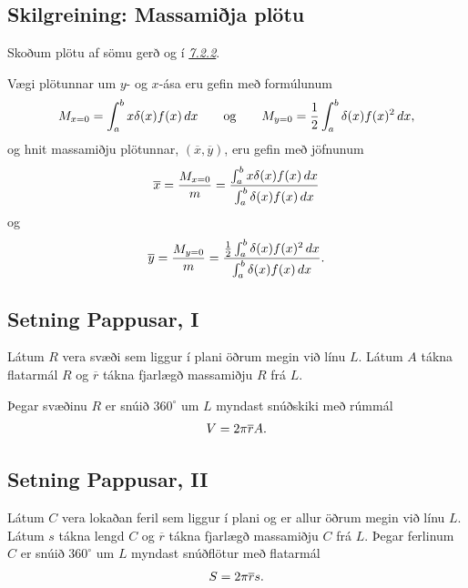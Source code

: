 \documentclass[b5paper,10pt,icelandic]{sphinxmanual}
\begin{document}
\subsection{Skilgreining: Massamiðja plötu}
\label{kafli07:skilgreining-massamija-plotu}\label{kafli07:index-14}
Skoðum plötu af sömu gerð og í {\hyperref[kafli07:massi\string-plotu]{\emph{7.2.2}}}.

Vægi plötunnar um \(y\)- og \(x\)-ása eru gefin með formúlunum
\begin{gather}
\begin{split}M_{x=0}=\int_a^b x\delta(x)f(x)\,dx
\qquad\mbox{og}\qquad
M_{y=0}=\frac{1}{2}\int_a^b \delta(x)f(x)^2\,dx,\end{split}\notag
\end{gather}
og hnit massamiðju plötunnar, \((\overline{x}, \overline{y})\), eru
gefin með jöfnunum
\begin{gather}
\begin{split}\overline{x}=\frac{M_{x=0}}{m}=
\frac{\int_a^b x\delta(x)f(x)\,dx}{\int_a^b \delta(x)f(x)\,dx}\end{split}\notag
\end{gather}
og
\begin{gather}
\begin{split}\overline{y}=\frac{M_{y=0}}{m}=
\frac{\frac{1}{2}\int_a^b \delta(x)f(x)^2\,dx}{\int_a^b
\delta(x)f(x)\,dx}.\end{split}\notag
\end{gather}

\subsection{Setning Pappusar, I}
\label{kafli07:index-15}\label{kafli07:setning-pappusar-i}
Látum \(R\) vera svæði sem liggur í plani öðrum megin við línu
\(L\). Látum \(A\) tákna flatarmál \(R\) og
\(\overline{r}\) tákna fjarlægð massamiðju \(R\) frá \(L\).

Þegar svæðinu \(R\) er snúið \(360^\circ\) um \(L\) myndast
snúðskiki með rúmmál
\begin{gather}
\begin{split}V=2\pi\overline{r}A.\end{split}\notag
\end{gather}

\subsection{Setning Pappusar, II}
\label{kafli07:setning-pappusar-ii}
Látum \(C\) vera lokaðan feril sem liggur í plani og er allur öðrum
megin við línu \(L\). Látum \(s\) tákna lengd \(C\) og
\(\overline{r}\) tákna fjarlægð massamiðju \(C\) frá \(L\).
Þegar ferlinum \(C\) er snúið \(360^\circ\) um \(L\) myndast
snúðflötur með flatarmál
\begin{gather}
\begin{split}S=2\pi\overline{r}s.\end{split}\notag
\end{gather}
\end{document}
